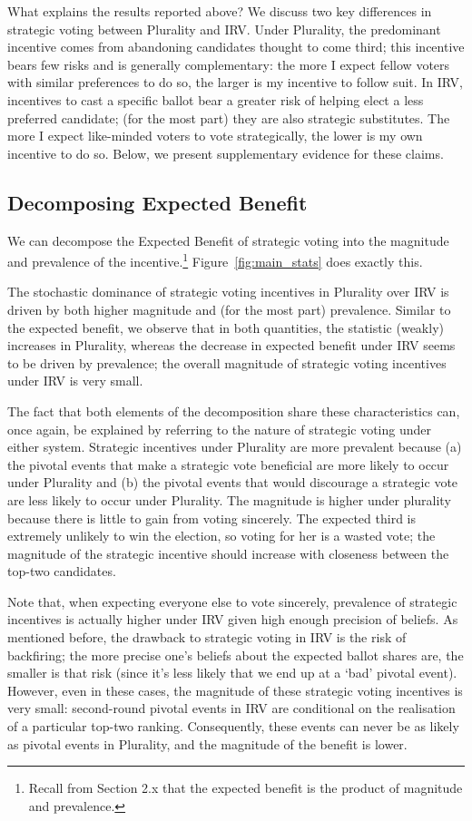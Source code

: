 \documentclass[12pt, letter]{article}
\begin{document}
What explains the results reported above? We discuss two key differences in strategic voting between Plurality and IRV. Under Plurality, the predominant incentive comes from abandoning candidates thought to come third; this incentive bears few risks and is generally complementary: the more I expect fellow voters with similar preferences to do so, the larger is my incentive to follow suit. In IRV, incentives to cast a specific ballot bear a greater risk of helping elect a less preferred candidate; (for the most part) they are also strategic substitutes. The more I expect like-minded voters to vote strategically, the lower is my own incentive to do so. Below, we present supplementary evidence for these claims.

\subsection{Decomposing Expected Benefit}

We can decompose the Expected Benefit of strategic voting into the magnitude and prevalence of the incentive.\footnote{Recall from Section 2.x that the expected benefit is the product of magnitude and prevalence.} Figure~\ref{fig:main_stats} does exactly this.

The stochastic dominance of strategic voting incentives in Plurality over IRV is driven by both higher magnitude and (for the most part) prevalence. Similar to the expected benefit, we observe that in both quantities, the statistic (weakly) increases in Plurality, whereas the decrease in expected benefit under IRV seems to be driven by prevalence; the overall magnitude of strategic voting incentives under IRV is very small.

The fact that both elements of the decomposition share these characteristics can, once again, be explained by referring to the nature of strategic voting under either system. Strategic incentives under Plurality are more prevalent because (a) the pivotal events that make a strategic vote beneficial are more likely to occur under Plurality and (b) the pivotal events that would discourage a strategic vote are less likely to occur under Plurality. The magnitude is higher under plurality because there is little to gain from voting sincerely. The expected third is extremely unlikely to win the election, so voting for her is a wasted vote; the magnitude of the strategic incentive should increase with closeness between the top-two candidates.

Note that, when expecting everyone else to vote sincerely, prevalence of strategic incentives is actually higher under IRV given high enough precision of beliefs. As mentioned before, the drawback to strategic voting in IRV is the risk of backfiring; the more precise one's beliefs about the expected ballot shares are, the smaller is that risk (since it's less likely that we end up at a `bad' pivotal event). However, even in these cases, the magnitude of these strategic voting incentives is very small: second-round pivotal events in IRV are conditional on the realisation of a particular top-two ranking. Consequently, these events can never be as likely as pivotal events in Plurality, and the magnitude of the benefit is lower.
\end{document}
